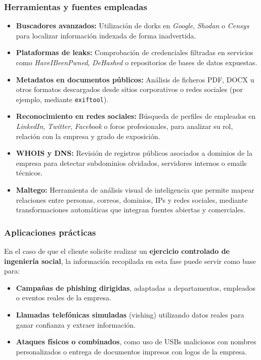 \documentclass[a4paper, 11pt]{article}
\begin{document}
\subsubsection*{Herramientas y fuentes empleadas}

\begin{itemize}
    \item \textbf{Buscadores avanzados:} Utilización de dorks en \textit{Google}, \textit{Shodan} o \textit{Censys} para localizar información indexada de forma inadvertida.
    \item \textbf{Plataformas de leaks:} Comprobación de credenciales filtradas en servicios como \textit{HaveIBeenPwned}, \textit{DeHashed} o repositorios de bases de datos expuestas.
    \item \textbf{Metadatos en documentos públicos:} Análisis de ficheros PDF, DOCX u otros formatos descargados desde sitios corporativos o redes sociales (por ejemplo, mediante \texttt{exiftool}).
    \item \textbf{Reconocimiento en redes sociales:} Búsqueda de perfiles de empleados en \textit{LinkedIn}, \textit{Twitter}, \textit{Facebook} o foros profesionales, para analizar su rol, relación con la empresa y grado de exposición.
    \item \textbf{WHOIS y DNS:} Revisión de registros públicos asociados a dominios de la empresa para detectar subdominios olvidados, servidores internos o emails técnicos.
    \item \textbf{Maltego:} Herramienta de análisis visual de inteligencia que permite mapear relaciones entre personas, correos, dominios, IPs y redes sociales, mediante transformaciones automáticas que integran fuentes abiertas y comerciales.
\end{itemize}


\subsubsection*{Aplicaciones prácticas}

En el caso de que el cliente solicite realizar un \textbf{ejercicio controlado de ingeniería social}, la información recopilada en esta fase puede servir como base para:

\begin{itemize}
    \item \textbf{Campañas de phishing dirigidas}, adaptadas a departamentos, empleados o eventos reales de la empresa.
    \item \textbf{Llamadas telefónicas simuladas} (vishing) utilizando datos reales para ganar confianza y extraer información.
    \item \textbf{Ataques físicos o combinados}, como uso de USBs maliciosos con nombres personalizados o entrega de documentos impresos con logos de la empresa.
\end{itemize}
\end{document}
